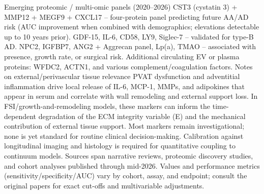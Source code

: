 Emerging proteomic / multi-omic panels (2020–2026)
CST3 (cystatin 3) + MMP12 + MEGF9 + CXCL17 – four-protein panel predicting future AA/AD risk (AUC improvement when combined with demographics; elevations detectable up to 10 years prior).
GDF-15, IL-6, CD58, LY9, Siglec-7 – validated for type-B AD.
NPC2, IGFBP7, ANG2 + Aggrecan panel, Lp(a), TMAO – associated with presence, growth rate, or surgical risk.
Additional circulating EV or plasma proteins: WFDC2, ACTN1, and various complement/coagulation factors.
Notes on external/perivascular tissue relevance
PVAT dysfunction and adventitial inflammation drive local release of IL-6, MCP-1, MMPs, and adipokines that appear in serum and correlate with wall remodeling and external support loss.
In FSI/growth-and-remodeling models, these markers can inform the time-dependent degradation of the ECM integrity variable (E) and the mechanical contribution of external tissue support.
Most markers remain investigational; none is yet standard for routine clinical decision-making. Calibration against longitudinal imaging and histology is required for quantitative coupling to continuum models.
Sources span narrative reviews, proteomic discovery studies, and cohort analyses published through mid-2026. Values and performance metrics (sensitivity/specificity/AUC) vary by cohort, assay, and endpoint; consult the original papers for exact cut-offs and multivariable adjustments.
